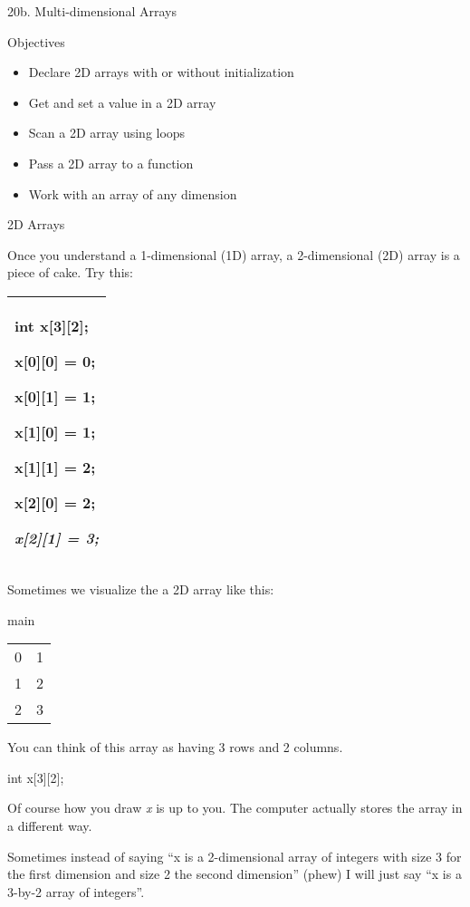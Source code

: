 \documentclass[
]{article}
\author{}
\date{}
\providecommand{\tightlist}{%
  \setlength{\itemsep}{0pt}\setlength{\parskip}{0pt}}
\begin{document}
20b. Multi-dimensional Arrays

Objectives

\begin{itemize}
\tightlist
\item
  Declare 2D arrays with or without initialization
\item
  Get and set a value in a 2D array
\item
  Scan a 2D array using loops
\item
  Pass a 2D array to a function
\item
  Work with an array of any dimension
\end{itemize}

2D Arrays

Once you understand a 1-dimensional (1D) array, a 2-dimensional (2D)
array is a piece of cake. Try this:

\begin{longtable}[]{@{}l@{}}
\toprule
\endhead
\begin{minipage}[t]{0.97\columnwidth}\raggedright
int x{[}3{]}\textbf{{[}2{]}};

x{[}0{]}{[}0{]} = 0;

x{[}0{]}{[}1{]} = 1;

x{[}1{]}{[}0{]} = 1;

x{[}1{]}{[}1{]} = 2;

x{[}2{]}{[}0{]} = 2;

\emph{x{[}2{]}{[}1{]} = 3;} \strut
\end{minipage}\tabularnewline
\bottomrule
\end{longtable}

Sometimes we visualize the a 2D array like this:

main

\begin{longtable}[]{@{}ll@{}}
\toprule
\endhead
0 & 1\tabularnewline
1 & 2\tabularnewline
2 & 3\tabularnewline
\bottomrule
\end{longtable}

You can think of this array as having 3 rows and 2 columns.

int x{[}3{]}{[}2{]};

Of course how you draw \emph{x} is up to you. The computer actually
stores the array in a different way.

Sometimes instead of saying ``x is a 2-dimensional array of integers
with size 3 for the first dimension and size 2 the second dimension''
(phew) I will just say ``x is a 3-by-2 array of integers''.
\end{document}
